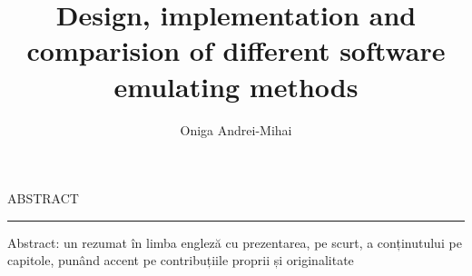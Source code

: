 \documentclass[12pt]{scrreport}
\begin{document}
\title{Design, implementation and comparision of different software emulating methods}					   
\author{Oniga Andrei-Mihai}											
				
\maketitle

\newpage
\thispagestyle{empty}
\mbox{}
\newpage
{}

\cleardoublepage
ABSTRACT
\vspace{0.5cm}	
\hrule
\vspace{0.5cm}	
Abstract: un rezumat în limba engleză cu prezentarea, pe scurt, a conținutului pe capitole, punând accent pe contribuțiile proprii și originalitate

\tableofcontents
\newpage
{}








\end{document}
